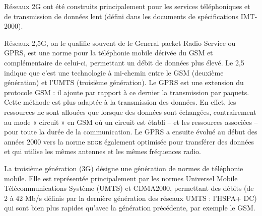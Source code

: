 Réseaux 2G ont été construits principalement pour les services téléphoniques et de transmission de données lent (défini dans les documents de spécifications IMT-2000).

Réseaux \textsf{2,5G}, on le qualifie souvent de le General packet Radio Service ou GPRS, est une norme pour la téléphonie mobile dérivée du GSM et complémentaire de celui-ci, permettant un débit de données plus élevé. Le 2,5 indique que c'est une technologie à mi-chemin entre le GSM (deuxième génération) et l'UMTS (troisième génération). Le GPRS est une extension du protocole GSM : il ajoute par rapport à ce dernier la transmission par paquets. Cette méthode est plus adaptée à la transmission des données. En effet, les ressources ne sont allouées que lorsque des données sont échangées, contrairement au mode « circuit » en GSM où un circuit est établi – et les ressources associées – pour toute la durée de la communication. Le GPRS a ensuite évolué au début des années 2000 vers la norme \textsc{edge} également optimisée pour transférer des données et qui utilise les mêmes antennes et les mêmes fréquences radio.

La troisième génération (3G) désigne une génération de normes de téléphonie mobile. Elle est représentée principalement par les normes Universel Mobile Télécommunications Système (UMTS) et CDMA2000, permettant des débits (de 2 à 42 Mb/s définis par la dernière génération des réseaux UMTS : l'HSPA+ DC) qui sont bien plus rapides qu'avec la génération précédente, par exemple le GSM.